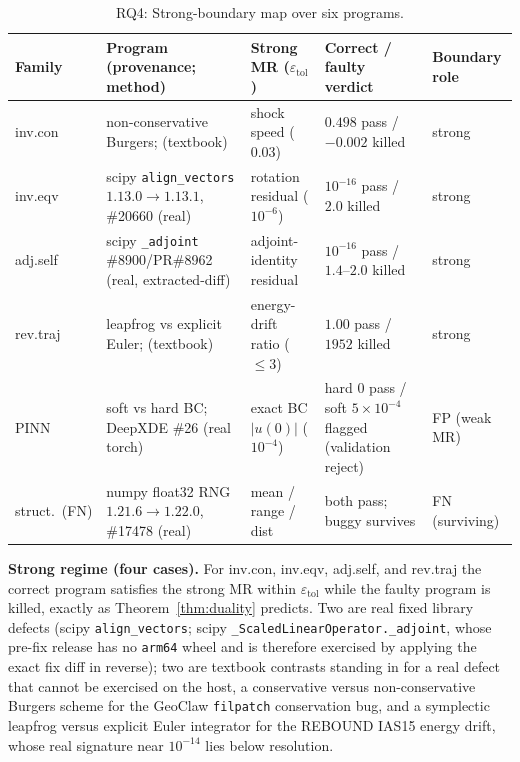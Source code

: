 \documentclass[manuscript,screen,review]{acmart}
\begin{document}
{%
\begin{longtable}[]{@{}p{1.6cm}p{3.4cm}p{2.5cm}p{2.6cm}p{1.7cm}@{}}
\caption{RQ4: Strong-boundary map over six programs.}\label{tab:p2-30}\\
\toprule\noalign{}
Family & Program (provenance; method) & Strong MR ($\varepsilon_{\mathrm{tol}}$) & Correct / faulty verdict & Boundary role \\
\midrule\noalign{}
\endfirsthead
\endhead
\bottomrule\noalign{}
\endlastfoot
inv.con & non-conservative Burgers; \citep{hou1994nonconservative} (textbook) & shock speed ($0.03$) & $0.498$ pass / $-0.002$ killed & strong \\
inv.eqv & scipy \texttt{align\_vectors} $1.13.0\to1.13.1$, \#20660 (real) & rotation residual ($10^{-6}$) & $10^{-16}$ pass / $2.0$ killed & strong \\
adj.self & scipy \texttt{\_adjoint} \#8900/PR\#8962 (real, extracted-diff) & adjoint-identity residual & $10^{-16}$ pass / $1.4$--$2.0$ killed & strong \\
rev.traj & leapfrog vs explicit Euler; \citep{hairer2006geometric} (textbook) & energy-drift ratio ($\leq 3$) & $1.00$ pass / $1952$ killed & strong \\
PINN & soft vs hard BC; DeepXDE \#26 (real torch) & exact BC $|u(0)|$ ($10^{-4}$) & hard $0$ pass / soft $5\times10^{-4}$ flagged (validation reject) & FP (weak MR) \\
struct.\ (FN) & numpy float32 RNG $1.21.6\to1.22.0$, \#17478 (real) & mean / range / dist & both pass; buggy survives & FN (surviving) \\
\end{longtable}
}

\textbf{Strong regime (four cases).} For inv.con, inv.eqv, adj.self, and
rev.traj the correct program satisfies the strong MR within
$\varepsilon_{\mathrm{tol}}$ while the faulty program is killed, exactly
as Theorem~\ref{thm:duality} predicts. Two are real fixed library defects (scipy
\texttt{align\_vectors}; scipy \texttt{\_ScaledLinearOperator.\_adjoint},
whose pre-fix release has no \texttt{arm64} wheel and is therefore
exercised by applying the exact fix diff in reverse); two are textbook
contrasts standing in for a real defect that cannot be exercised on the
host, a conservative versus non-conservative Burgers scheme for the
GeoClaw \texttt{filpatch} conservation bug, and a symplectic leapfrog
versus explicit Euler integrator for the REBOUND IAS15 energy drift, whose
real signature near $10^{-14}$ lies below resolution.
\end{document}
